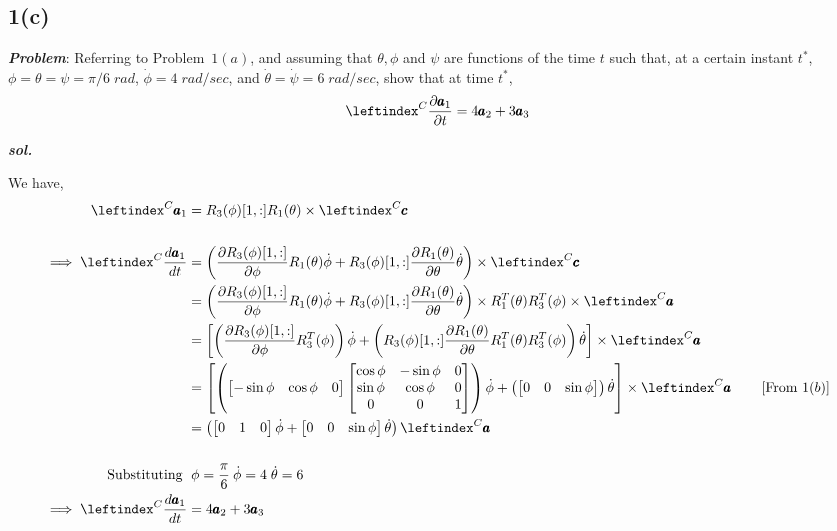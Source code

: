 \subsection{1(c)}
\textbf{\textit{Problem}}: Referring to Problem~$1(a)$, and assuming that $\theta, \phi$ and $\psi$ are functions of the time $t$ such that, at a certain instant $t^*$, $\phi = \theta = \psi = \pi/6 \; rad$, $\dot \phi = 4 \; rad/sec$, and $\dot \theta = \dot \psi = 6 \; rad/sec$, show that at time $t^*$,
$$ \lx{^C}{\frac{\partial \pmb a_1}{\partial t}} = 4 \pmb a_2 + 3 \pmb a_3$$

\textbf{\textit{sol.}}

We have,
\begin{align*}
    \lx{^C}{{\pmb a_1}} &= R_3(\phi)[1, :] R_1(\theta) \times \lx{^C}{\pmb c}\\
    \\
    \implies \lx{^C}{\frac{d \pmb a_1}{dt}} &= \left( \frac{\partial R_3(\phi)[1, :]}{\partial \phi}   R_1(\theta) \dot \phi + R_3(\phi)[1, :] \frac{\partial R_1(\theta)}{\partial \theta } \dot \theta \right) \times \lx{^C}{\pmb c}\\
    &= \left( \frac{\partial R_3(\phi)[1, :]}{\partial \phi}   R_1(\theta) \dot \phi + R_3(\phi)[1, :] \frac{\partial R_1(\theta)}{\partial \theta } \dot \theta \right) \times R_1^T(\theta) R_3^T(\phi) \times \lx{^C}{\pmb a}\\
    &= \left[
    \left(\frac{\partial R_3(\phi)[1, :]}{\partial \phi}   R_3^T(\phi)
    \right)\dot \phi +
    \left(R_3(\phi)[1, :] \frac{\partial R_1(\theta)}{\partial \theta } R_1^T(\theta) R_3^T(\phi)
    \right) \dot \theta
    \right]\times \lx{^C}{\pmb a}\\
    &= \left[
    \left(\bm{-\sin \phi & \cos \phi & 0}\bm{
            \cos \phi & -\sin \phi  & 0\\
            \sin \phi & \cos \phi & 0\\
            0          & 0         & 1
        }
    \right)\dot \phi +
    \left(\bm{0 & 0 & \sin \phi}
    \right) \dot \theta
    \right]\times \lx{^C}{\pmb a}
    \qquad \left[\text{From } 1(b) \right]\\
    &= \left( \bm{0&1&0} \dot \phi + \bm{0 & 0 & \sin \phi} \dot \theta \right) \lx{^C}{{\pmb a}}\\
    \\
    \text{Substituting }&\; \phi = \frac{\pi}{6} \: \dot \phi =4 \; \dot \theta = 6\\
    \implies \lx{^C}{\frac{d \pmb a_1}{dt}} &= 4 \pmb a_2 + 3 \pmb a_3
\end{align*}
